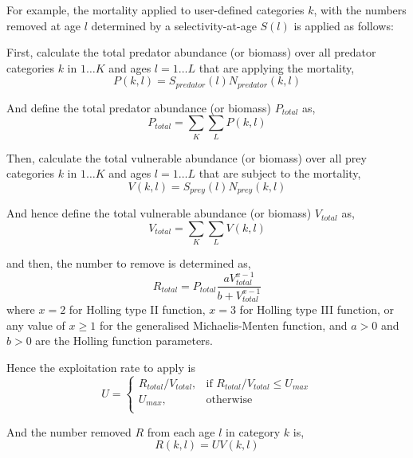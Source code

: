 For example, the mortality applied to user-defined categories $k$, with the numbers removed at age $l$ determined by a selectivity-at-age $S(l)$ is applied as follows:

First, calculate the total predator abundance (or biomass) over all predator categories $k$ in $1 \ldots K$ and ages $l = 1 \ldots L$ that are applying the mortality,
\begin{equation}
  P(k,l) = S_{predator}(l) N_{predator}(k,l)
\end{equation}

And define the total predator abundance (or biomass) $P_{total}$ as,
\begin{equation}
  P_{total}  = \sum\limits_K {\sum\limits_L {P(k,l)}} 
\end{equation}

Then, calculate the total vulnerable abundance (or biomass) over all prey categories $k$ in $1 \ldots K$ and ages $l = 1 \ldots L$ that are subject to the mortality,
\begin{equation}
  V(k,l) = S_{prey}(l) N_{prey}(k,l)
\end{equation}

And hence define the total vulnerable abundance (or biomass) $V_{total}$ as,
\begin{equation}
  V_{total}  = \sum\limits_K {\sum\limits_L {V(k,l)}} 
\end{equation}

and then, the number to remove is determined as,
\begin{equation}
R_{total} = P_{total} \frac{a  V_{total}^{x-1}}{b + V_{total}^{x-1}}
\end{equation}
where $x=2$ for Holling type II function,  $x=3$ for Holling type III function, or any value of $x \geq 1$ for the generalised Michaelis-Menten function, and $a > 0$ and $b > 0$ are the Holling function parameters.

Hence the exploitation rate to apply is 
\begin{equation}
U = \begin{cases}
  R_{total}/V_{total}, & \text{if $R_{total}/V_{total} \leq U_{max}$} \\
  U_{max}, & \text{otherwise}\\ 
  \end{cases} 
\end{equation}

And the number removed $R$ from each age $l$ in category $k$ is,
\begin{equation}
  R(k,l) = UV(k,l)
\end{equation}


